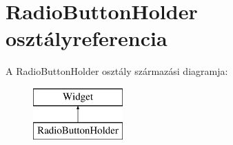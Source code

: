 \hypertarget{class_radio_button_holder}{}\section{Radio\+Button\+Holder osztályreferencia}
\label{class_radio_button_holder}
A Radio\+Button\+Holder osztály származási diagramja\+:\begin{figure}[H]
\begin{center}
\leavevmode
\includegraphics[height=2.000000cm]{class_radio_button_holder}
\end{center}
\end{figure}

